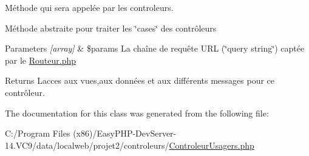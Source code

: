 Méthode qui sera appelée par les controleurs. 

Méthode abstraite pour traiter les \char`\"{}cases\char`\"{} des contrôleurs 
\begin{DoxyParams}{Parameters}
{\em \mbox{[}array\mbox{]}} & \$params La chaîne de requête U\+RL (\char`\"{}query string\char`\"{}) captée par le \hyperlink{_routeur_8php}{Routeur.\+php} \\
\hline
\end{DoxyParams}
\begin{DoxyReturn}{Returns}
L\textquotesingle{}acces aux vues,aux données et aux différents messages pour ce contrôleur. 
\end{DoxyReturn}


The documentation for this class was generated from the following file\+:\begin{DoxyCompactItemize}
\item 
C\+:/\+Program Files (x86)/\+Easy\+P\+H\+P-\/\+Dev\+Server-\/14.\+V\+C9/data/localweb/projet2/controleurs/\hyperlink{_controleur_usagers_8php}{Controleur\+Usagers.\+php}\end{DoxyCompactItemize}
